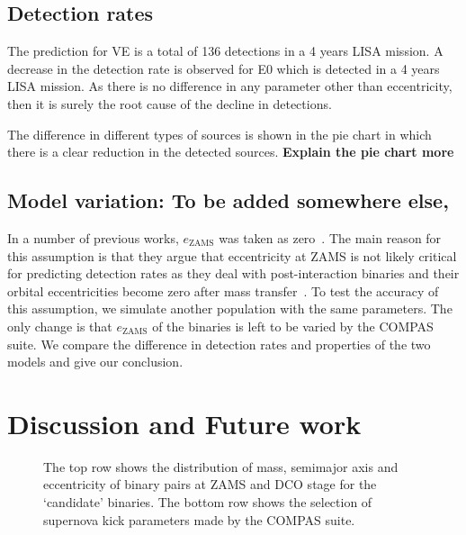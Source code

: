 \documentclass[journal, twocolumns]{IEEEtran}
\begin{document}
	
    \subsection{Detection rates}\label{subsec:detectionetection-rates}
    The prediction for VE is a total of 136 detections in a 4 years LISA mission.
    A decrease in the detection rate is observed for E0 which is detected in a 4 years LISA mission.
    As there is no difference in any parameter other than eccentricity, then it is surely the root cause of the decline in detections.

    The difference in different types of sources is shown in the pie chart in which there is a clear reduction in the detected sources. \textbf{Explain the pie chart more}


    \subsection{Model variation: To be added somewhere else,}
    \label{subsec:model_variation}
    In a number of previous works, $e_\text{ZAMS}$ was taken as zero~\cite{Vigna2018, Barrett2018, Lau2020, Broekgaarden2021, wagg2021gravitational}.
    The main reason for this assumption is that they argue that eccentricity at ZAMS is not likely critical for predicting detection rates as they deal with post-interaction binaries and their orbital eccentricities become zero after mass transfer~\cite{Hurley2002}. %
    To test the accuracy of this assumption, we simulate another population with the same parameters.
    The only change is that $e_\text{ZAMS}$ of the binaries is left to be varied by the COMPAS suite.
    We compare the difference in detection rates and properties of the two models and give our conclusion.


    \section{Discussion and Future work}\label{sec:df}
    
        \begin{figure}[!h]%
    	\centering
    	\caption{The top row shows the distribution of mass, semimajor axis and eccentricity of binary pairs at ZAMS and DCO stage for the `candidate' binaries. The bottom row shows the selection of supernova kick parameters made by the COMPAS suite.}
    	\label{fig:all_zams_params}
    \end{figure}%
    
    \ifCLASSOPTIONcaptionsoff
    \newpage
    \fi

    \cleardoublepage
    
    

    \cleardoublepage
    \appendices
    
    \newpage
    
    \newpage
    
\end{document}

